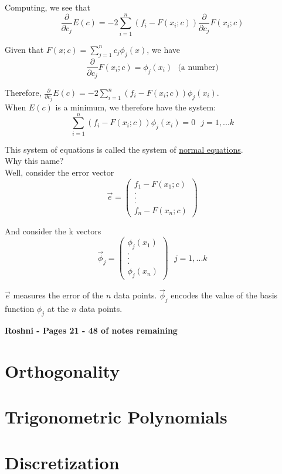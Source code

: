 {Computing, we see that
\begin{equation*}
    \frac{\partial}{\partial c_j} E(c) = -2 \sum_{i=1}^{n} (f_i - F(x_i; c)) \frac{\partial}{\partial c_j} F(x_i; c)
\end{equation*}

Given that $F(x; c) = \sum_{j=1}^{n} c_j \phi_j (x)$, we have
\begin{equation*}
    \frac{\partial}{\partial c_j} F(x_i; c) = \phi_j(x_i)~~~\text{(a number)}
\end{equation*}

Therefore, $\frac{\partial}{\partial c_j} E(c) = -2 \sum_{i=1}^{n} (f_i - F(x_i; c)) \phi_j(x_i)$. \\

When $E(c)$ is a minimum, we therefore have the system:
\begin{equation*}
    \sum_{i=1}^{n} (f_i - F(x_i; c)) \phi_j(x_i) = 0~~~j = 1, ... k
\end{equation*}

This system of equations is called the system of \underline{normal equations}.\\

Why this name? \\

Well, consider the error vector
\begin{equation*}
    \vec{e} = \begin{pmatrix} f_1 - F(x_1; c) \\ . \\ . \\ . \\ f_n - F(x_n; c) \end{pmatrix}
\end{equation*}

And consider the k vectors
\begin{equation*}
    \vec{\phi}_j = \begin{pmatrix} \phi_j(x_1) \\ . \\ . \\ . \\ \phi_j(x_n) \end{pmatrix}~~~j = 1, ... k
\end{equation*}

$\vec{e}$ measures the error of the $n$ data points. $\vec{\phi}_j$ encodes the value of the basis function $\phi_j$ at the $n$ data points.
}

\textbf{Roshni - Pages 21 - 48 of notes remaining}

\section{Orthogonality}

\section{Trigonometric Polynomials}

\section{Discretization}
